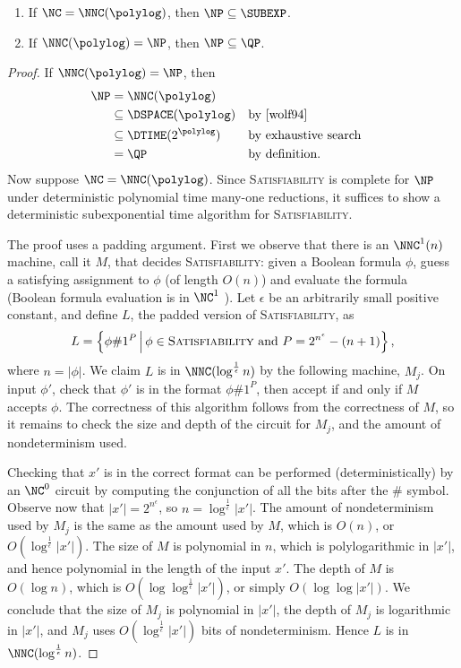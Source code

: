 \documentclass{article}
\begin{document}
\begin{theorem}
  \mbox{}
  \begin{enumerate}
  \item If $\NC = \NNC(\polylog)$, then $\NP \subseteq \SUBEXP$.
  \item If $\NNC(\polylog) = \NP$, then $\NP \subseteq \QP$.
  \end{enumerate}
\end{theorem}
\begin{proof}
  If $\NNC(\polylog) = \NP$, then
  \begin{align*}
    \NP & = \NNC(\polylog) \\
        & \subseteq \DSPACE(\polylog) && \text{by \cite{wolf94}} \\
        & \subseteq \DTIME(2^{\polylog}) && \text{by exhaustive search} \\
        & = \QP && \text{by definition}.
  \end{align*}
  Now suppose $\NC = \NNC(\polylog)$.
  Since \textsc{Satisfiability} is complete for $\NP$ under deterministic polynomial time many-one reductions, it suffices to show a deterministic subexponential time algorithm for \textsc{Satisfiability}.

  The proof uses a padding argument.
  First we observe that there is an $\NNC^1(n)$ machine, call it $M$, that decides \textsc{Satisfiability}: given a Boolean formula $\phi$, guess a satisfying assignment to $\phi$ (of length $O(n)$) and evaluate the formula (Boolean formula evaluation is in $\NC^1$ \cite{buss87}).
  Let $\epsilon$ be an arbitrarily small positive constant, and define $L$, the padded version of \textsc{Satisfiability}, as
  \begin{equation*}
    L = \left\{ \phi \# 1^P \, \middle| \, \phi \in \textsc{Satisfiability} \text{ and } P = 2^{n^\epsilon} - (n + 1) \right\},
  \end{equation*}
  where $n = |\phi|$.
  We claim $L$ is in $\NNC(\log^\frac{1}{\epsilon} n)$ by the following machine, $M_j$.
  On input $\phi'$, check that $\phi'$ is in the format $\phi \# 1^P$, then accept if and only if $M$ accepts $\phi$.
  The correctness of this algorithm follows from the correctness of $M$, so it remains to check the size and depth of the circuit for $M_j$, and the amount of nondeterminism used.

  Checking that $x'$ is in the correct format can be performed (deterministically) by an $\NC^0$ circuit by computing the conjunction of all the bits after the $\#$ symbol.
  Observe now that $|x'| = 2^{n^\epsilon}$, so $n = \log^\frac{1}{\epsilon}{|x'|}$.
  The amount of nondeterminism used by $M_j$ is the same as the amount used by $M$, which is $O(n)$, or $O(\log^\frac{1}{\epsilon} |x'|)$.
  The size of $M$ is polynomial in $n$, which is polylogarithmic in $|x'|$, and hence polynomial in the length of the input $x'$.
  The depth of $M$ is $O(\log n)$, which is $O(\log \log^\frac{1}{\epsilon} |x'|)$, or simply $O(\log \log |x'|)$.
  We conclude that the size of $M_j$ is polynomial in $|x'|$, the depth of $M_j$ is logarithmic in $|x'|$, and $M_j$ uses $O(\log^\frac{1}{\epsilon} |x'|)$ bits of nondeterminism.
  Hence $L$ is in $\NNC(\log^\frac{1}{\epsilon} n)$.


\end{proof}
\end{document}
